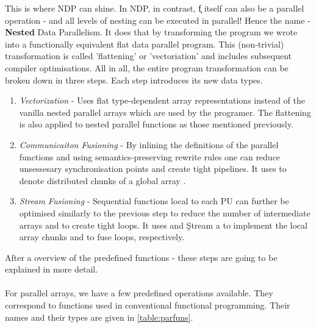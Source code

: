     
    This is where NDP can shine. In NDP, in contrast, \c{f} itself can
    also be a parallel operation - and all levels of nesting can
    be executed in parallel! Hence the name - \textbf{Nested} Data Parallelism.
    It does that by transforming the program we wrote into a functionally
    equivalent flat data parallel program. This (non-trivial) transformation
    is called 'flattening' or 'vectoriation' and includes subsequent compiler optimisations.
    All in all, the entire program transformation can be broken down in three steps.
    Each step introduces its new data types.
    \begin{enumerate}
      \item \emph{Vectorization} -
        Uses flat type-dependent array \pav{} representations instead of the
        vanilla nested parallel arrays \pan{} which are used by the programer.
        The flattening is also applied to nested parallel functions as
        those mentioned previously.
      \item \emph{Communicaiton Fusioning} -
        By inlining the definitions of the parallel functions and
        using semantics-preserving rewrite rules one can
        reduce unsessesary synchronisation points and
        create tight pipelines. It uses \pad{} to denote
        distributed chunks of a global array \pav{}.
      \item \emph{Stream Fusioning} -
        Sequential functions local to each PU can further
        be optimised similarly to the previous step
        to reduce the number of intermediate arrays and
        to create tight loops.
        It uses  and \c{Stream a} to
        implement the local array chunks and to fuse loops, respectively.
    \end{enumerate}
    
  After a overview of the predefined functions - these steps
  are going to be explained in more detail.
  
  \paragraph{}
    For parallel arrays, we have a few predefined operations available.
    They correspond to functions used in conventional functional programming.
    Their names and their types are given in \ref{table:parfuns}.
    
